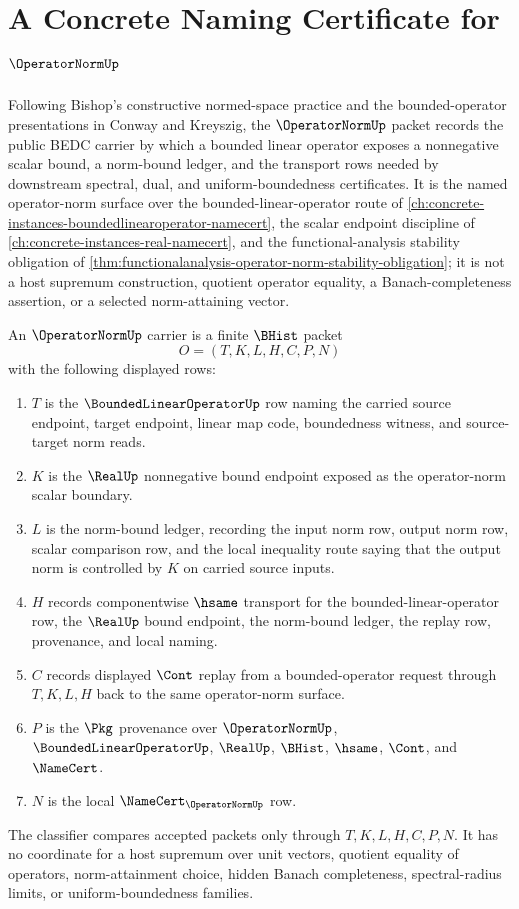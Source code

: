 \chapter{A Concrete Naming Certificate for $\OperatorNormUp$}
\label{ch:concrete-instances-operator-norm-namecert}

Following Bishop's constructive normed-space practice and the bounded-operator presentations in Conway and Kreyszig, the $\OperatorNormUp$ packet records the public BEDC carrier by which a bounded linear operator exposes a nonnegative scalar bound, a norm-bound ledger, and the transport rows needed by downstream spectral, dual, and uniform-boundedness certificates. It is the named operator-norm surface over the bounded-linear-operator route of \autoref{ch:concrete-instances-boundedlinearoperator-namecert}, the scalar endpoint discipline of \autoref{ch:concrete-instances-real-namecert}, and the functional-analysis stability obligation of \autoref{thm:functionalanalysis-operator-norm-stability-obligation}; it is not a host supremum construction, quotient operator equality, a Banach-completeness assertion, or a selected norm-attaining vector.

\begin{definition}
\label{def:operator-norm-carrier}
An $\OperatorNormUp$ carrier is a finite $\BHist$ packet
$$
O=(T,K,L,H,C,P,N)
$$
with the following displayed rows:
\begin{enumerate}
\item $T$ is the $\BoundedLinearOperatorUp$ row naming the carried source endpoint, target endpoint, linear map code, boundedness witness, and source-target norm reads.
\item $K$ is the $\RealUp$ nonnegative bound endpoint exposed as the operator-norm scalar boundary.
\item $L$ is the norm-bound ledger, recording the input norm row, output norm row, scalar comparison row, and the local inequality route saying that the output norm is controlled by $K$ on carried source inputs.
\item $H$ records componentwise $\hsame$ transport for the bounded-linear-operator row, the $\RealUp$ bound endpoint, the norm-bound ledger, the replay row, provenance, and local naming.
\item $C$ records displayed $\Cont$ replay from a bounded-operator request through $T,K,L,H$ back to the same operator-norm surface.
\item $P$ is the $\Pkg$ provenance over $\OperatorNormUp$, $\BoundedLinearOperatorUp$, $\RealUp$, $\BHist$, $\hsame$, $\Cont$, and $\NameCert$.
\item $N$ is the local $\NameCert_{\OperatorNormUp}$ row.
\end{enumerate}
The classifier compares accepted packets only through $T,K,L,H,C,P,N$. It has no coordinate for a host supremum over unit vectors, quotient equality of operators, norm-attainment choice, hidden Banach completeness, spectral-radius limits, or uniform-boundedness families.
\end{definition}

